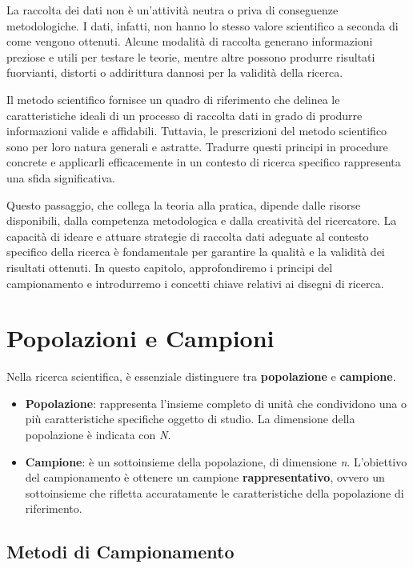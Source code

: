 \documentclass[
  letterpaper,
]{krantz}
\providecommand{\tightlist}{%
  \setlength{\itemsep}{0pt}\setlength{\parskip}{0pt}}\usepackage{longtable,booktabs,array}
\begin{document}
La raccolta dei dati non è un'attività neutra o priva di conseguenze
metodologiche. I dati, infatti, non hanno lo stesso valore scientifico a
seconda di come vengono ottenuti. Alcune modalità di raccolta generano
informazioni preziose e utili per testare le teorie, mentre altre
possono produrre risultati fuorvianti, distorti o addirittura dannosi
per la validità della ricerca.

Il metodo scientifico fornisce un quadro di riferimento che delinea le
caratteristiche ideali di un processo di raccolta dati in grado di
produrre informazioni valide e affidabili. Tuttavia, le prescrizioni del
metodo scientifico sono per loro natura generali e astratte. Tradurre
questi principi in procedure concrete e applicarli efficacemente in un
contesto di ricerca specifico rappresenta una sfida significativa.

Questo passaggio, che collega la teoria alla pratica, dipende dalle
risorse disponibili, dalla competenza metodologica e dalla creatività
del ricercatore. La capacità di ideare e attuare strategie di raccolta
dati adeguate al contesto specifico della ricerca è fondamentale per
garantire la qualità e la validità dei risultati ottenuti. In questo
capitolo, approfondiremo i principi del campionamento e introdurremo i
concetti chiave relativi ai disegni di ricerca.

\section{Popolazioni e Campioni}\label{popolazioni-e-campioni-1}

Nella ricerca scientifica, è essenziale distinguere tra
\textbf{popolazione} e \textbf{campione}.

\begin{itemize}
\tightlist
\item
  \textbf{Popolazione}: rappresenta l'insieme completo di unità che
  condividono una o più caratteristiche specifiche oggetto di studio. La
  dimensione della popolazione è indicata con \emph{N}.
\item
  \textbf{Campione}: è un sottoinsieme della popolazione, di dimensione
  \emph{n}. L'obiettivo del campionamento è ottenere un campione
  \textbf{rappresentativo}, ovvero un sottoinsieme che rifletta
  accuratamente le caratteristiche della popolazione di riferimento.
\end{itemize}

\subsection{Metodi di Campionamento}\label{metodi-di-campionamento}
\end{document}

